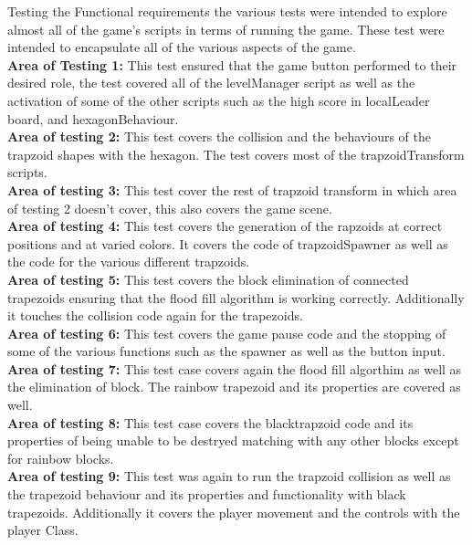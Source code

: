 \documentclass[12pt, titlepage]{article}
\begin{document}
Testing the Functional requirements the various tests were intended to explore almost all of the game's scripts in terms of running the game. These test were intended to encapsulate all of the various aspects of the game.\\

\textbf{Area of Testing 1:} This test ensured that the game button performed to their desired role, the test covered all of the levelManager script as well as the activation of some of the other scripts such as the high score in localLeader board, and hexagonBehaviour. \\

\textbf{Area of testing 2:} This test covers the collision and the behaviours of the trapzoid shapes with the hexagon. The test covers most of the trapzoidTransform scripts. \\

\textbf{Area of testing 3:} This test cover the rest of trapzoid transform in which area of testing 2 doesn't cover, this also covers the game scene.\\

\textbf{Area of testing 4:} This test covers the generation of the rapzoids at correct positions and at varied colors. It covers the code of trapzoidSpawner as well as the code for the various different trapzoids.\\

\textbf{Area of testing 5:} This test covers the block elimination of connected trapezoids ensuring that the flood fill algorithm is working correctly. Additionally it touches the collision code again for the trapezoids.\\

\textbf{Area of testing 6:} This test covers the game pause code and the stopping of some of the various functions such as the spawner as well as the button input. \\

\textbf{Area of testing 7:} This test case covers again the flood fill algorthim as well as the elimination of block. The rainbow trapezoid and its properties are covered as well. \\

\textbf{Area of testing 8:} This test case covers the blacktrapzoid code and its properties of being unable to be destryed matching with any other blocks except for rainbow blocks. \\

\textbf{Area of testing 9:} This test was again to run the trapzoid collision as well as the trapezoid behaviour and its properties and functionality with black trapezoids. Additionally it covers the player movement and the controls with the player Class.\\
\end{document}
